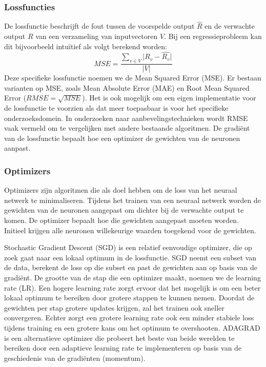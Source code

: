 \subsubsection{Lossfuncties}
\label{sec:chapt2_ml_loss_functions}
De lossfunctie beschrijft de fout tussen de voorspelde output $\hat{R}$ en de verwachte output $R$ van een verzameling van inputvectoren $V$. Bij een regressieprobleem kan dit bijvoorbeeld intuïtief als volgt berekend worden:
\begin{equation}
    MSE = \frac{\sum_{v \in V} \lvert R_v - \hat{R_v}\rvert}{\lvert V \rvert}   
    \label{eq:chapt2_mse}
\end{equation}
Deze specifieke lossfunctie noemen we de Mean Squared Error (MSE). Er bestaan varianten op MSE, zoals Mean Absolute Error (MAE) en Root Mean Squared Error ($RMSE = \sqrt{MSE}$). Het is ook mogelijk om een eigen implementatie voor de lossfunctie te voorzien als dat meer toepasbaar is voor het specifieke onderzoeksdomein. In onderzoeken naar aanbevelingstechnieken wordt RMSE vaak vermeld om te vergelijken met andere bestaande algoritmen. \cite{narre, deepconn, wide_deep_learning_paper} De gradiënt van de lossfunctie bepaalt hoe een optimizer de gewichten van de neuronen aanpast.

\subsubsection{Optimizers}
Optimizers zijn algoritmen die als doel hebben om de loss van het neuraal netwerk te minimaliseren. Tijdens het trainen van een neuraal netwerk worden de gewichten van de neuronen aangepast om dichter bij de verwachte output te komen. De optimizer bepaalt hoe die gewichten aangepast moeten worden. Initieel krijgen alle neuronen willekeurige waarden toegekend voor de gewichten.

Stochastic Gradient Descent (SGD) is een relatief eenvoudige optimizer, die op zoek gaat naar een lokaal optimum in de lossfunctie. SGD neemt een subset van de data, berekent de loss op die subset en past de gewichten aan op basis van de gradiënt. \cite{SGD_paper} De grootte van de stap die een optimizer maakt, noemen we de learning rate (LR). Een hogere learning rate zorgt ervoor dat het mogelijk is om een beter lokaal optimum te bereiken door grotere stappen te kunnen nemen. Doordat de gewichten per stap grotere updates krijgen, zal het trainen ook sneller convergeren. Echter zorgt een grotere learning rate ook een minder stabiele loss tijdens training en een grotere kans om het optimum te overshooten. \newline
ADAGRAD is een alternatieve optimizer die probeert het beste van beide werelden te bereiken door een adaptieve learning rate te implementeren op basis van de geschiedenis van de gradiënten (momentum). \cite{adagrad_paper}

